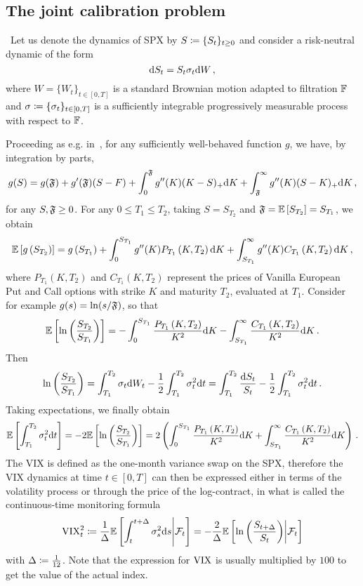 \subsection{The joint calibration problem}\
Let us denote the dynamics of SPX by $S\coloneqq\{S_t\}_{t\geq 0}$ and consider a risk-neutral dynamic of the form
\[
\mathrm{d} S_t = S_t \sigma_t \mathrm{d} W\,,
\]
where $W=\{W_t\}_{t\in[0,T]}$ is a standard Brownian motion adapted to filtration $\mathbb{F}$ and $\sigma\coloneqq\{\sigma_t\}_{t\in[0,T]}$ is a sufficiently integrable progressively measurable process with respect to $\mathbb{F}$. 

Proceeding as e.g. in~\cite[Chapter~11]{Gatheral2006TheGuide}, for any sufficiently well-behaved function $g$, we have, by integration by parts,
$$
g(S)=g(\mathfrak{F})+g'(\mathfrak{F})(S-F)+\int_0^{\mathfrak{F}} g''(K)(K-S)_{+} \mathrm{d} K+\int_{\mathfrak{F}}^{\infty} g''(K)(S-K)_{+} \mathrm{d} K\,,
$$
for any $S, \mathfrak{F} \geq 0$. For any $0 \leq T_1 \leq T_2$, taking $S=S_{T_2}$ and $\mathfrak{F} = \mathbb{E}\left[S_{T_2}\right]=S_{T_1}$, we obtain
$$
\mathbb{E}\left[g\left(S_{T_2}\right)\right]=g\left(S_{T_1}\right)+\int_0^{S_{T_1}} g''(K) P_{T_1}\left(K, T_2\right) \mathrm{d} K+\int_{S_{T_1}}^{\infty} g''(K) C_{T_1}\left(K, T_2\right) \mathrm{d} K\,,
$$
where $P_{T_1}\left(K, T_2\right)$ and $C_{T_1}\left(K, T_2\right)$ represent the prices of Vanilla European Put and Call options with strike $K$ and maturity $T_2$, evaluated at $T_1$. Consider for example $g(s)=\ln (s / \mathfrak{F})$, so that
$$
\mathbb{E}\left[\ln \left(\frac{S_{T_2}}{S_{T_1}}\right)\right]=-\int_0^{S_{T_1}} \frac{P_{T_1}\left(K, T_2\right)}{K^2} \mathrm{d} K-\int_{S_{T_1}}^{\infty} \frac{C_{T_1}\left(K, T_2\right)}{K^2} \mathrm{d} K\,.
$$
Then
$$
\ln \left(\frac{S_{T_2}}{S_{T_1}}\right)=\int_{T_1}^{T_2} \sigma_t \mathrm{d} W_t-\frac{1}{2} \int_{T_1}^{T_2} \sigma_t^2 \mathrm{d} t=\int_{T_1}^{T_2} \frac{\mathrm{d} S_t}{S_t}-\frac{1}{2} \int_{T_1}^{T_2} \sigma_t^2 \mathrm{d} t\,.
$$
Taking expectations, we finally obtain
\[
\mathbb{E}\left[\int_{T_1}^{T_2} \sigma_t^2 \mathrm{d} t\right]=-2 \mathbb{E}\left[\ln \left(\frac{S_{T_2}}{S_{T_1}}\right)\right]=2\left(\int_0^{S_{T_1}} \frac{P_{T_1}\left(K, T_2\right)}{K^2} \mathrm{d} K+\int_{S_{T_1}}^{\infty} \frac{C_{T_1}\left(K, T_2\right)}{K^2} \mathrm{d} K\right)\,.
\]
The VIX is defined as the one-month variance swap on the SPX, therefore the VIX dynamics at time $t\in[0, T]$ can then be expressed either in terms of the volatility process or through the price of the log-contract, in what is called the continuous-time monitoring formula
\begin{equation*}
\mathrm{VIX}_{t}^{2} \coloneqq \frac{1}{\Delta} \mathbb{E}\left[\int_{t}^{t+\Delta} \sigma^2_{s} \mathrm{d} s\middle\vert\mathcal{F}_t \right] = -\frac{2}{\Delta}\mathbb{E} \left[\ln\left(\frac{S_{t+\Delta}}{S_t} \right) \middle\vert\mathcal{F}_t \right] \label{eq:VIXdef}
\end{equation*}
with $\Delta\coloneqq\frac{1}{12}$. Note that the expression for $\mathrm{VIX}$ is usually multiplied by $100$ to get the value of the actual index. 

